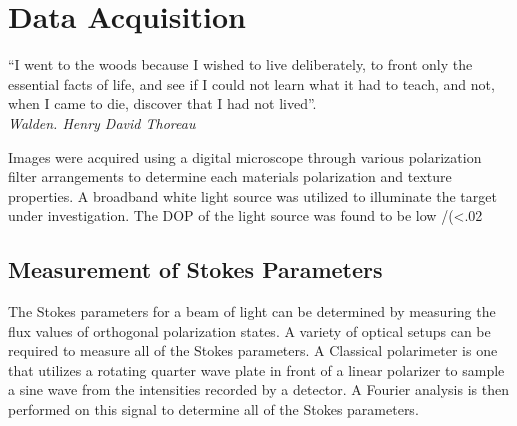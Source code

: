 \chapter{Data Acquisition}
\begin{center}
  \begin{minipage}{0.75\textwidth}
    \begin{small}
      “I went to the woods because I wished to live deliberately, to front only the essential facts of life, and see if I could not learn what it had to teach, and not, when I came to die, discover that I had not lived”.\\
      \null\hfill\emph{Walden. Henry David Thoreau}
    \end{small}
  \end{minipage}
  \vspace{0.5cm}
\end{center}

Images were acquired using a digital microscope through various polarization filter arrangements to determine each materials polarization and texture properties.  A broadband white light source was utilized to illuminate the target under investigation.  The DOP of the light source was found to be low /(<.02%

\section{Measurement of Stokes Parameters}
The Stokes parameters for a beam of light can be determined by measuring the flux values of orthogonal polarization states.  A variety of optical setups can be required to measure all of the Stokes parameters.  A Classical polarimeter is one that utilizes a rotating quarter wave plate in front of a linear polarizer to sample a sine wave from the intensities recorded by a detector.  A Fourier analysis is then performed on this signal to determine all of the Stokes parameters.

